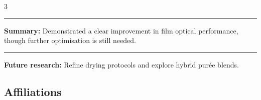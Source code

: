 \documentclass[
]{ImperialPoster}
\begin{document}
\begin{multicols}{3}
\vspace{-1.2\baselineskip}

\begin{center}
  \textcolor{ICLBlue}{\rule{\linewidth}{0.2pt}} %
  \vspace{1mm}
  \textcolor{ICLBlue}{\textbf{Summary:}} Demonstrated a clear improvement in film optical performance, though further optimisation is still needed.
  \vspace{1mm}
  \textcolor{ICLBlue}{\rule{\linewidth}{0.2pt}} %
\end{center}



\vspace{-1.2\baselineskip}
\textbf{\textcolor{ICLBlue}{ Future research:}}  Refine drying protocols and explore hybrid pur\'{e}e blends.
  
	
	
	\subsection{Affiliations}
	
	\\
    \hspace{1mm}

\vspace{-1.2\baselineskip}

\end{multicols}
\end{document}
